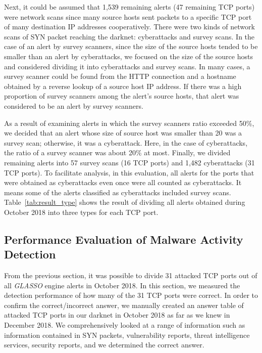 \documentclass[conference]{IEEEtran}
\begin{document}
Next, it could be assumed that 1,539 remaining alerts (47 remaining TCP ports) were network scans since many source hosts sent packets to a specific TCP port of many destination IP addresses cooperatively.
There were two kinds of network scans of SYN packet reaching the darknet: cyberattacks and survey scans.
In the case of an alert by survey scanners, since the size of the source hosts tended to be smaller than an alert by cyberattacks, we focused on the size of the source hosts and considered dividing it into cyberattacks and survey scans.
In many cases, a survey scanner could be found from the HTTP connection and a hostname obtained by a reverse lookup of a source host IP address.
If there was a high proportion of survey scanners among the alert's source hosts, that alert was considered to be an alert by survey scanners.

As a result of examining alerts in which the survey scanners ratio exceeded 50\%, we decided that an alert whose size of source host was smaller than 20 was a survey scan; otherwise, it was a cyberattack.
Here, in the case of cyberattacks, the ratio of a survey scanner was about 20\% at most.
Finally, we divided remaining alerts into 57 survey scans (16 TCP ports) and 1,482 cyberattacks (31 TCP ports).
To facilitate analysis, in this evaluation, all alerts for the ports that were obtained as cyberattacks even once were all counted as cyberattacks.
It means some of the alerts classified as cyberattacks included survey scans.
Table~\ref{tab:result_type} shows the result of dividing all alerts obtained during October 2018 into three types for each TCP port.



\subsection{Performance Evaluation of Malware Activity Detection}
\label{Performance}
From the previous section, it was possible to divide 31 attacked TCP ports out of all \textit{GLASSO} engine alerts in October 2018.
In this section, we measured the detection performance of how many of the 31 TCP ports were correct.
In order to confirm the correct/incorrect answer, we manually created an answer table of attacked TCP ports in our darknet in October 2018 as far as we knew in December 2018.
We comprehensively looked at a range of information such as information contained in SYN packets, vulnerability reports, threat intelligence services, security reports, and we determined the correct answer.
\end{document}
